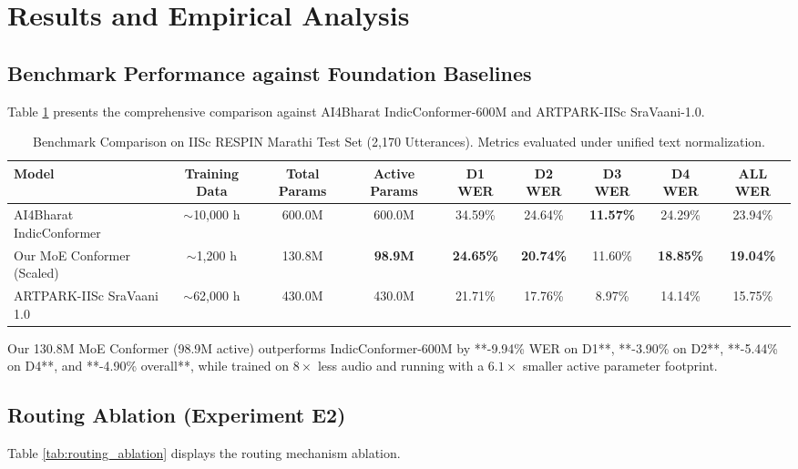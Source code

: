 \documentclass{article}
\begin{document}
\section{Results and Empirical Analysis}

\subsection{Benchmark Performance against Foundation Baselines}
Table \ref{tab:main_benchmark} presents the comprehensive comparison against AI4Bharat IndicConformer-600M and ARTPARK-IISc SraVaani-1.0.

\begin{table}[t]
\centering
\caption{Benchmark Comparison on IISc RESPIN Marathi Test Set (2,170 Utterances). Metrics evaluated under unified text normalization.}
\label{tab:main_benchmark}
\begin{tabular}{lcccccccc}
\toprule
\textbf{Model} & \textbf{Training Data} & \textbf{Total Params} & \textbf{Active Params} & \textbf{D1 WER} & \textbf{D2 WER} & \textbf{D3 WER} & \textbf{D4 WER} & \textbf{ALL WER} \\
\midrule
AI4Bharat IndicConformer & $\sim$10,000 h & 600.0M & 600.0M & 34.59\% & 24.64\% & \textbf{11.57\%} & 24.29\% & 23.94\% \\
Our MoE Conformer (Scaled) & $\sim$1,200 h & 130.8M & \textbf{98.9M} & \textbf{24.65\%} & \textbf{20.74\%} & 11.60\% & \textbf{18.85\%} & \textbf{19.04\%} \\
\midrule
ARTPARK-IISc SraVaani 1.0 & $\sim$62,000 h & 430.0M & 430.0M & 21.71\% & 17.76\% & 8.97\% & 14.14\% & 15.75\% \\
\bottomrule
\end{tabular}
\end{table}

Our 130.8M MoE Conformer (98.9M active) outperforms IndicConformer-600M by **-9.94\% WER on D1**, **-3.90\% on D2**, **-5.44\% on D4**, and **-4.90\% overall**, while trained on $8\times$ less audio and running with a $6.1\times$ smaller active parameter footprint.

\subsection{Routing Ablation (Experiment E2)}
Table \ref{tab:routing_ablation} displays the routing mechanism ablation.
\end{document}
